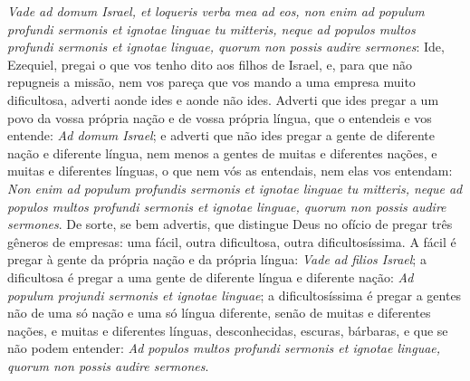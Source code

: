 \emph{Vade ad domum Israel, et loqueris verba mea ad eos, non enim ad
populum profundi sermonis et ignotae linguae tu mitteris, neque ad
populos multos profundi sermonis et ignotae linguae, quorum non possis
audire sermones}: Ide, Ezequiel, pregai o que vos tenho %
dito aos filhos de Israel, e, para que não repugneis a missão, nem vos
pareça que vos mando a uma empresa muito dificultosa, adverti aonde ides
e aonde não ides. Adverti que ides pregar a um povo da vossa própria
nação e de vossa própria língua, que o entendeis e vos entende: \emph{Ad
domum Israel}; e adverti que não ides pregar a gente de diferente nação
e diferente língua, nem menos a gentes de muitas e diferentes nações, e
muitas e diferentes línguas, o que nem vós as entendais, nem elas vos
entendam: \emph{Non enim ad populum profundis sermonis et ignotae
linguae tu mitteris, neque ad populos multos profundi sermonis et
ignotae linguae, quorum non possis audire sermones}. De sorte, se bem
advertis, que distingue Deus no ofício de pregar três gêneros de
empresas: uma fácil, outra dificultosa, outra dificultosíssima. A fácil
é pregar à gente da própria nação e da própria língua: \emph{Vade ad
filios Israel}; a dificultosa é pregar a uma gente de diferente língua e
diferente nação: \emph{Ad populum projundi sermonis et ignotae linguae};
a dificultosíssima é pregar a gentes não de uma só nação e uma só língua
diferente, senão de muitas e diferentes nações, e muitas e diferentes
línguas, desconhecidas, escuras, bárbaras, e que se não podem entender:
\emph{Ad populos multos profundi sermonis et ignotae linguae, quorum non
possis audire sermones}.

